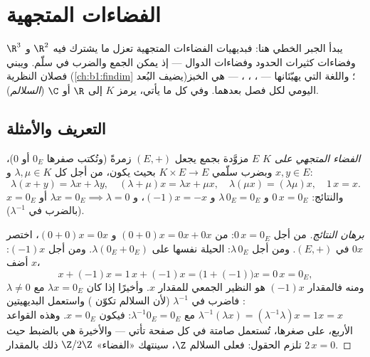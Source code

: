 \chapter{الفضاءات المتجهية}\label{ch:b1:vspaces}

يبدأ الجبر الخطي هنا: فبديهيات الفضاءات المتجهية تعزل ما
يشترك فيه $\R^2$ و $\R^3$ وفضاءات كثيرات الحدود وفضاءات الدوال
--- إذ يمكن الجمع والضرب في سلّم. ويبني فصلان النظرية
(\cref{ch:b1:findim} يضيف البُعد)؛ واللغة التي يهيّئانها ---
، ، ،  --- هي الخبز اليومي لكل
فصل بعدهما. وفي كل ما يأتي، يرمز $K$ إلى $\R$ أو $\C$
(\emph{السلالم}).

\section{التعريف والأمثلة}

\begin{definition}\label{def:b1:vspaces:def}
\emph{الفضاء المتجهي على $K$}  $E$ مزوَّدة
بجمع يجعل $(E, +)$ زمرةً  (وتُكتب صفرها $0_E$ أو
$0$)، وبضرب سلّمي $K \times E \to E$ بحيث يكون، من أجل
كل $\lambda, \mu \in K$ و $x, y \in E$:
\[
\lambda(x + y) = \lambda x + \lambda y,\quad
(\lambda + \mu) x = \lambda x + \mu x,\quad
\lambda(\mu x) = (\lambda\mu) x,\quad
1\,x = x .
\]
والنتائج: $0\,x = 0_E$ و $\lambda\,0_E = 0_E$ و $(-1)x = -x$، و
$\lambda x = 0_E \implies \lambda = 0$ أو $x = 0_E$ (بالضرب في
$\lambda^{-1}$).
\end{definition}

\begin{proof}[برهان النتائج]
من أجل $0\,x = 0_E$: من $(0 + 0)x = 0x + 0x$ و $(0+0)x = 0x$،
اختصر $0x$ في  $(E, +)$. ومن أجل $\lambda\,0_E$: الحيلة
نفسها على $\lambda(0_E + 0_E)$. ومن أجل $(-1)x$: أضف $x$،
\[
x + (-1)x = 1\,x + (-1)x = \bigl(1 + (-1)\bigr)x = 0\,x = 0_E ,
\]
ومنه فالمقدار $(-1)x$ هو النظير الجمعي للمقدار $x$. وأخيرًا إذا كان $\lambda x
= 0_E$ مع $\lambda \neq 0$: فاضرب في $\lambda^{-1}$ (لأن
السلالم تكوّن ) واستعمل البديهيتين
$\lambda^{-1}(\lambda x) = (\lambda^{-1}\lambda)x = 1x = x$
مع $\lambda^{-1}0_E = 0_E$: فيكون $x = 0_E$. وهذه القواعد الأربع، على
صغرها، تُستعمل صامتة في كل صفحة تأتي
--- والأخيرة هي بالضبط حيث تلزم الحقول:
فعلى السلالم $\Z$، سينتهك «الفضاء» $\Z/2\Z$ ذلك
بالمقدار $2\,x = 0$.
\end{proof}

